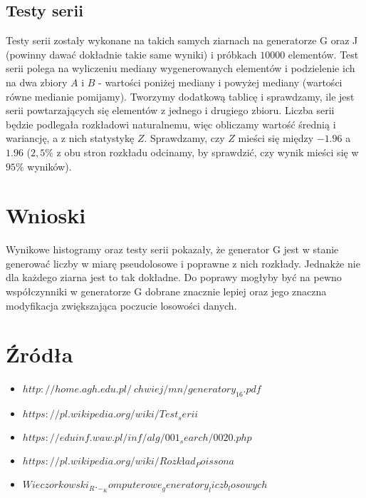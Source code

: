 \documentclass[60pt]{article}
\begin{document}
\subsection{Testy serii}
Testy serii zostały wykonane na takich samych ziarnach na generatorze G oraz J (powinny dawać dokładnie takie same wyniki) i próbkach $10000$ elementów. Test serii polega na wyliczeniu mediany wygenerowanych elementów i podzielenie ich na dwa zbiory $A$ i $B$ - wartości poniżej mediany i powyżej mediany (wartości równe medianie pomijamy). Tworzymy dodatkową tablicę i sprawdzamy, ile jest serii powtarzających się elementów z jednego i drugiego zbioru. Liczba serii będzie podlegała rozkładowi naturalnemu, więc obliczamy wartość średnią i wariancję, a z nich statystykę $Z$. Sprawdzamy, czy $Z$ mieści się między $-1.96$ a $1.96$ ($2,5\%$ z obu stron rozkładu odcinamy, by sprawdzić, czy wynik mieści się w $95\%$ wyników).

\section{Wnioski}
Wynikowe histogramy oraz testy serii pokazały, że generator G jest w stanie generować liczby w miarę pseudolosowe i poprawne z nich rozkłady. Jednakże nie dla każdego ziarna jest to tak dokładne. Do poprawy mogłyby być na pewno współczynniki w generatorze G dobrane znacznie lepiej oraz jego znaczna modyfikacja zwiększająca poczucie losowości danych. 


\newpage

\section{Źródła}
\begin{itemize}
    \item $http://home.agh.edu.pl/~chwiej/mn/generatory_16.pdf$
    \item $https://pl.wikipedia.org/wiki/Test_serii$
    \item $https://eduinf.waw.pl/inf/alg/001_search/0020.php$
    \item $https://pl.wikipedia.org/wiki/Rozkład_Poissona$
    \item $Wieczorkowski_R._-_Komputerowe_generatory_liczb_losowych$
\end{itemize}
\end{document}
